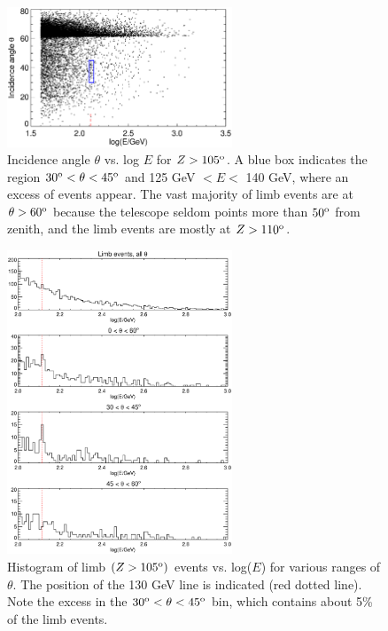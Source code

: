 \documentclass[aps,twocolumn,prd,superscriptaddress,showpacs,nofootinbib,fixfloat]{revtex4}
\newcommand{\degree}{^{\rm o}}
\begin{document}
\begin{figure}[p]
\centering
\includegraphics[width=0.6\textwidth]{plots/theta-E.ps}
\caption{Incidence angle $\theta$ vs. log $E$ for $Z > 105\degree$.  A blue
  box indicates the region $30\degree < \theta < 45\degree$ and 125 GeV $< E
  <$ 140 GeV, where an excess of events appear.  The vast majority of limb
  events are at $\theta > 60\degree$ because the telescope seldom points more
  than $50\degree$ from zenith, and the limb events are mostly at
  $Z>110\degree$.}
\label{fig:theta-E}
\end{figure}


\begin{figure}[p]
\centering
\includegraphics[width=0.6\textwidth]{plots/Ehist-all.ps}
\caption{Histogram of limb $(Z>105\degree)$ events vs. log($E$) for various
  ranges of $\theta$. The position of the 130 GeV line is indicated (red
  dotted line).  Note the excess in the $30\degree < \theta < 45\degree$ bin,
  which contains about 5\% of the limb events.}
\label{fig:Ehist-all}
\end{figure}
\end{document}
